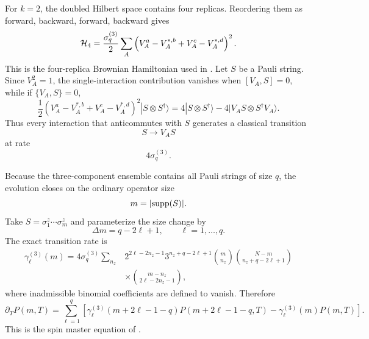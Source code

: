 \documentclass{article}
\theoremstyle{definition}
\begin{document}
For $k=2$, the doubled Hilbert space contains four replicas.  Reordering
them as forward, backward, forward, backward gives
\begin{equation}
    {\cal H}_4
    =\frac{\sigma_q^{(3)}}{2}
    \sum_A
    \left(
       V_A^a-V_A^{*,b}+V_A^c-V_A^{*,d}
    \right)^2.
\end{equation}
This is the four-replica Brownian Hamiltonian used in
\cite{xu2025dynamics}.  Let $S$ be a Pauli string.  Since $V_A^2=1$, the
single-interaction contribution vanishes when $[V_A,S]=0$, while if
$\{V_A,S\}=0$,
\begin{equation}
    \frac12
    \left(
       V_A^a-V_A^{*,b}+V_A^c-V_A^{*,d}
    \right)^2
    |S\otimes S^\dagger\rangle
    =4|S\otimes S^\dagger\rangle
     -4|V_AS\otimes S^\dagger V_A\rangle.
\end{equation}
Thus every interaction that anticommutes with $S$ generates a classical
transition
\begin{equation}
    S\longrightarrow V_AS
\end{equation}
at rate
\begin{equation}
    4\sigma_q^{(3)}.
\end{equation}

Because the three-component ensemble contains all Pauli strings of size
$q$, the evolution closes on the ordinary operator size
\begin{equation}
    m=|{\rm supp}(S)|.
\end{equation}
Take $S=\sigma_1^z\cdots\sigma_m^z$ and parameterize the size change by
\begin{equation}
    \Delta m=q-2\ell+1,
    \qquad \ell=1,\ldots,q.
\end{equation}
The exact transition rate is
\begin{align}
    \gamma_\ell^{(3)}(m)
    =4\sigma_q^{(3)}\sum_{n_z}
    &2^{2\ell-2n_z-1}
     3^{n_z+q-2\ell+1}
     \binom{m}{n_z}
     \binom{N-m}{n_z+q-2\ell+1}
    \nonumber\\
    &\times
     \binom{m-n_z}{2\ell-2n_z-1},
\end{align}
where inadmissible binomial coefficients are defined to vanish.  Therefore
\begin{equation}
    \partial_TP(m,T)
    =\sum_{\ell=1}^q
    \left[
       \gamma_\ell^{(3)}(m+2\ell-1-q)
       P(m+2\ell-1-q,T)
       -\gamma_\ell^{(3)}(m)P(m,T)
    \right].
\end{equation}
This is the spin master equation of \cite{xu2025dynamics}.
\end{document}
